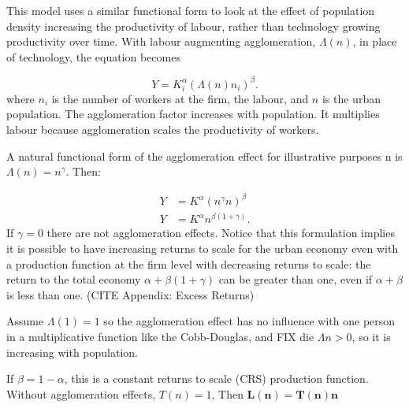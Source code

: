 This model uses a similar functional form to look at  the effect of population density increasing %
 the productivity of labour, rather than technology growing productivity over time. With labour augmenting agglomeration, $\Lambda(n)$, in place of technology, the equation becomes 

\begin{equation} 
Y=K_i^{\alpha }(\Lambda(n)n_i)^{\beta }.
\label{Eqn:Prod1}
\end{equation} 
where $n_i$ is the number of workers at the firm, the labour, and $n$ is the urban population. The agglomeration factor increases with population. It multiplies labour because agglomeration scales the productivity of workers. 

A natural functional form of the agglomeration effect for illustrative purposes n is $\Lambda(n) = n^\gamma$. Then:

\begin{eqnarray}
 Y&=K^{\alpha }(n^{\gamma}n)^{\beta}  \nonumber\\
 Y&=K^{\alpha }n^{\beta(1 + \gamma)}.
 \label{Eqn:Prod2}
\end{eqnarray}
If $\gamma=0$ there are not agglomeration effects. Notice that  this formulation implies it is possible to have increasing returns to scale for the urban economy even with a production function at the firm level with decreasing returns to scale: the return to the total economy $\alpha + \beta(1 + \gamma)$ can be greater than one, even if $\alpha +\beta$ is less than one. %
(CITE Appendix: Excess Returns)

Assume $\Lambda(1)=1$ so the agglomeration effect has no influence with one person in a multiplicative function like the Cobb-Douglas, and %
FIX die ${\Lambda}{n}>0$, so it is increasing with population.

If $\beta=1-\alpha$, this is a constant returns to scale (CRS) production function. Without agglomeration effects, $T(n)=1$,  Then  \textbf{$\mathbf{L(n) = T(n) n}$} 


